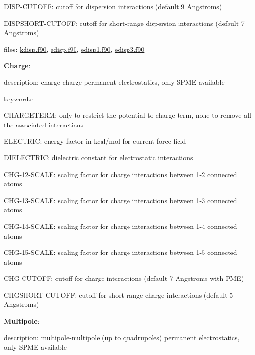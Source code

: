\begin{DoxyItemize}
\begin{DoxyItemize}
\begin{DoxyItemize}
\item D\-I\-S\-P-\/\-C\-U\-T\-O\-F\-F\-: cutoff for dispersion interactions (default 9 Angstroms)
\item D\-I\-S\-P\-S\-H\-O\-R\-T-\/\-C\-U\-T\-O\-F\-F\-: cutoff for short-\/range dispersion interactions (default 7 Angstroms)
\end{DoxyItemize}
\item files\-: \hyperlink{kdisp_8f90}{kdisp.\-f90}, \hyperlink{edisp_8f90}{edisp.\-f90}, \hyperlink{edisp1_8f90}{edisp1.\-f90}, \hyperlink{edisp3_8f90}{edisp3.\-f90}
\end{DoxyItemize}
\item {\bfseries Charge}\-:
\begin{DoxyItemize}
\item description\-: charge-\/charge permanent electrostatics, only S\-P\-M\-E available
\item keywords\-:
\begin{DoxyItemize}
\item C\-H\-A\-R\-G\-E\-T\-E\-R\-M\-: only to restrict the potential to charge term, none to remove all the associated interactions
\item E\-L\-E\-C\-T\-R\-I\-C\-: energy factor in kcal/mol for current force field
\item D\-I\-E\-L\-E\-C\-T\-R\-I\-C\-: dielectric constant for electrostatic interactions
\item C\-H\-G-\/12-\/\-S\-C\-A\-L\-E\-: scaling factor for charge interactions between 1-\/2 connected atoms
\item C\-H\-G-\/13-\/\-S\-C\-A\-L\-E\-: scaling factor for charge interactions between 1-\/3 connected atoms
\item C\-H\-G-\/14-\/\-S\-C\-A\-L\-E\-: scaling factor for charge interactions between 1-\/4 connected atoms
\item C\-H\-G-\/15-\/\-S\-C\-A\-L\-E\-: scaling factor for charge interactions between 1-\/5 connected atoms
\item C\-H\-G-\/\-C\-U\-T\-O\-F\-F\-: cutoff for charge interactions (default 7 Angstroms with P\-M\-E)
\item C\-H\-G\-S\-H\-O\-R\-T-\/\-C\-U\-T\-O\-F\-F\-: cutoff for short-\/range charge interactions (default 5 Angstroms)
\end{DoxyItemize}
\end{DoxyItemize}
\item {\bfseries Multipole}\-:
\begin{DoxyItemize}
\item description\-: multipole-\/multipole (up to quadrupoles) permanent electrostatics, only S\-P\-M\-E available

\end{DoxyItemize}
\end{DoxyItemize}
